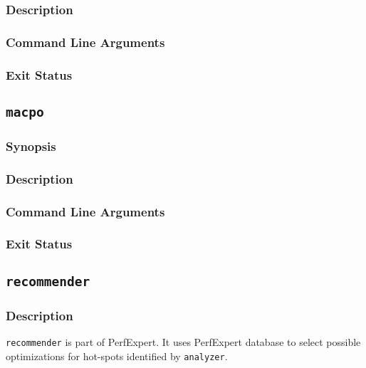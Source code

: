 \subsubsection{Description}

\subsubsection{Command Line Arguments}

\subsubsection{Exit Status}

\subsection{\texttt{macpo}}

\subsubsection{Synopsis}

\subsubsection{Description}

\subsubsection{Command Line Arguments}

\subsubsection{Exit Status}

\subsection{\texttt{recommender}}

\subsubsection{Description}

\texttt{recommender} is part of PerfExpert. It uses PerfExpert database to select possible optimizations for hot-spots identified by \texttt{analyzer}.

     
